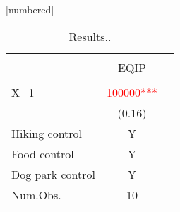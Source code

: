\begin{table}
[numbered]
\caption{Results..}
 \vspace{-.2cm} 
\centering
\begin{tabular}[t]{lcc}
\\[-1.8ex]
\hline \\[-1.8ex] 
\multicolumn{1}{c}{ } & \multicolumn{1}{c}{EQIP} \\
\hline \\[-1.8ex] 
X=1 &\textcolor{red} {\num{100000}***} &   \\
 & (\num{0.16}) \\

Hiking control & Y \\
Food control& Y  \\
Dog park control& Y  \\
Num.Obs. & \num{10}  \\
\bottomrule

\end{tabular}

\end{table}